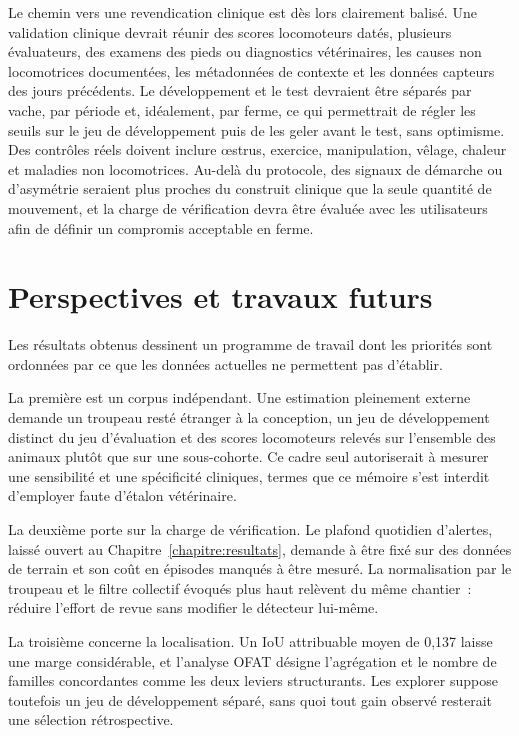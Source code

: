 Le chemin vers une revendication clinique est dès lors clairement balisé. Une validation
clinique devrait réunir des scores locomoteurs datés, plusieurs évaluateurs, des examens des
pieds ou diagnostics vétérinaires, les causes non locomotrices documentées, les métadonnées
de contexte et les données capteurs des jours précédents. Le
développement et le test devraient être séparés par vache, par période et, idéalement, par
ferme, ce qui permettrait de régler les seuils sur le jeu de développement puis de les geler
avant le test, sans optimisme. Des contrôles réels doivent inclure œstrus, exercice,
manipulation, vêlage, chaleur et maladies non locomotrices. Au-delà du protocole, des signaux
de démarche ou d'asymétrie seraient plus proches du construit clinique que la seule quantité
de mouvement, et la charge de vérification devra être évaluée avec les utilisateurs afin de
définir un compromis acceptable en ferme.

\section{Perspectives et travaux futurs}
Les résultats obtenus dessinent un programme de travail dont les priorités sont ordonnées par
ce que les données actuelles ne permettent pas d'établir.

La première est un corpus indépendant. Une estimation pleinement externe demande un troupeau
resté étranger à la conception, un jeu de développement distinct du jeu d'évaluation et des
scores locomoteurs relevés sur l'ensemble des animaux plutôt que sur une sous-cohorte. Ce
cadre seul autoriserait à mesurer une sensibilité et une spécificité cliniques, termes que ce
mémoire s'est interdit d'employer faute d'étalon vétérinaire.

La deuxième porte sur la charge de vérification. Le plafond quotidien d'alertes, laissé ouvert
au Chapitre~\ref{chapitre:resultats}, demande à être fixé sur des données de terrain et son
coût en épisodes manqués à être mesuré. La normalisation par le troupeau et le filtre collectif
évoqués plus haut relèvent du même chantier~: réduire l'effort de revue sans modifier le
détecteur lui-même.

La troisième concerne la localisation. Un IoU attribuable moyen de 0,137 laisse une marge
considérable, et l'analyse OFAT désigne l'agrégation et le nombre de familles concordantes
comme les deux leviers structurants. Les explorer suppose toutefois un jeu de développement
séparé, sans quoi tout gain observé resterait une sélection rétrospective.

